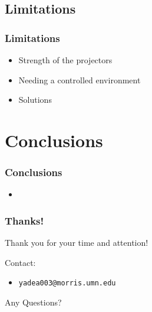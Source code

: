 \documentclass{beamer}
\newcommand{\linespace}{\vskip 0.25cm}
\begin{document}
\subsection{Limitations}
\begin{frame}	
\frametitle{Limitations}
	\begin{itemize}
		\item Strength of the projectors 
		\item Needing a controlled environment 
		\item Solutions
	\end{itemize}
\end{frame}

\section[Conclusions]{Conclusions}
\begin{frame}
\frametitle{Conclusions}
	\begin{itemize}
		\item 
	\end{itemize}
\end{frame}

\begin{frame}
	\frametitle{Thanks!}
	
	Thank you for your time and attention!
		
	\linespace
	\linespace
	
	Contact:  
	\begin{itemize}
		\item \texttt{yadea003@morris.umn.edu}
	\end{itemize}
	
	\linespace
	\linespace
	
	\begin{center}
	{\huge Any Questions?}
	\end{center}
\end{frame}
\end{document}
